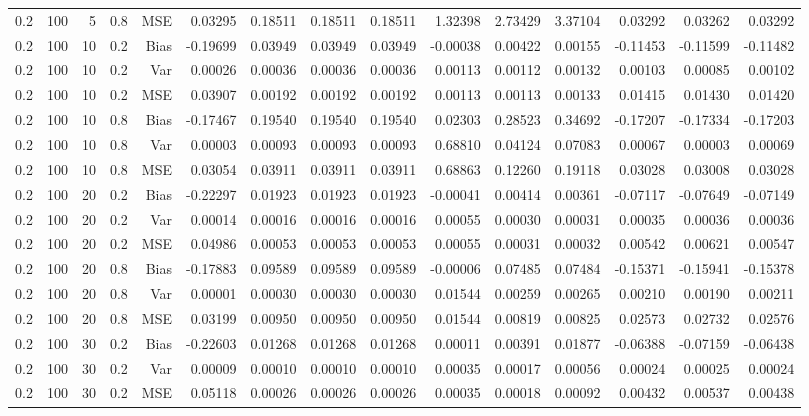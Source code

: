 \begin{table}[!htbp]
\begin{tabular}{lrrrrrrrrrrrrrr}
0.2 & 100 &  5 & 0.8 & MSE & 0.03295 & 0.18511 & 0.18511 & 0.18511 & 1.32398 & 2.73429 & 3.37104 & 0.03292 & 0.03262 & 0.03292 \\
0.2 & 100 & 10 & 0.2 & Bias & -0.19699 & 0.03949 & 0.03949 & 0.03949 & -0.00038 & 0.00422 & 0.00155 & -0.11453 & -0.11599 & -0.11482 \\
0.2 & 100 & 10 & 0.2 & Var & 0.00026 & 0.00036 & 0.00036 & 0.00036 & 0.00113 & 0.00112 & 0.00132 & 0.00103 & 0.00085 & 0.00102 \\
0.2 & 100 & 10 & 0.2 & MSE & 0.03907 & 0.00192 & 0.00192 & 0.00192 & 0.00113 & 0.00113 & 0.00133 & 0.01415 & 0.01430 & 0.01420 \\
0.2 & 100 & 10 & 0.8 & Bias & -0.17467 & 0.19540 & 0.19540 & 0.19540 & 0.02303 & 0.28523 & 0.34692 & -0.17207 & -0.17334 & -0.17203 \\
0.2 & 100 & 10 & 0.8 & Var & 0.00003 & 0.00093 & 0.00093 & 0.00093 & 0.68810 & 0.04124 & 0.07083 & 0.00067 & 0.00003 & 0.00069 \\
0.2 & 100 & 10 & 0.8 & MSE & 0.03054 & 0.03911 & 0.03911 & 0.03911 & 0.68863 & 0.12260 & 0.19118 & 0.03028 & 0.03008 & 0.03028 \\
0.2 & 100 & 20 & 0.2 & Bias & -0.22297 & 0.01923 & 0.01923 & 0.01923 & -0.00041 & 0.00414 & 0.00361 & -0.07117 & -0.07649 & -0.07149 \\
0.2 & 100 & 20 & 0.2 & Var & 0.00014 & 0.00016 & 0.00016 & 0.00016 & 0.00055 & 0.00030 & 0.00031 & 0.00035 & 0.00036 & 0.00036 \\
0.2 & 100 & 20 & 0.2 & MSE & 0.04986 & 0.00053 & 0.00053 & 0.00053 & 0.00055 & 0.00031 & 0.00032 & 0.00542 & 0.00621 & 0.00547 \\
0.2 & 100 & 20 & 0.8 & Bias & -0.17883 & 0.09589 & 0.09589 & 0.09589 & -0.00006 & 0.07485 & 0.07484 & -0.15371 & -0.15941 & -0.15378 \\
0.2 & 100 & 20 & 0.8 & Var & 0.00001 & 0.00030 & 0.00030 & 0.00030 & 0.01544 & 0.00259 & 0.00265 & 0.00210 & 0.00190 & 0.00211 \\
0.2 & 100 & 20 & 0.8 & MSE & 0.03199 & 0.00950 & 0.00950 & 0.00950 & 0.01544 & 0.00819 & 0.00825 & 0.02573 & 0.02732 & 0.02576 \\
0.2 & 100 & 30 & 0.2 & Bias & -0.22603 & 0.01268 & 0.01268 & 0.01268 & 0.00011 & 0.00391 & 0.01877 & -0.06388 & -0.07159 & -0.06438 \\
0.2 & 100 & 30 & 0.2 & Var & 0.00009 & 0.00010 & 0.00010 & 0.00010 & 0.00035 & 0.00017 & 0.00056 & 0.00024 & 0.00025 & 0.00024 \\
0.2 & 100 & 30 & 0.2 & MSE & 0.05118 & 0.00026 & 0.00026 & 0.00026 & 0.00035 & 0.00018 & 0.00092 & 0.00432 & 0.00537 & 0.00438 \\

\end{tabular}
\end{table}
